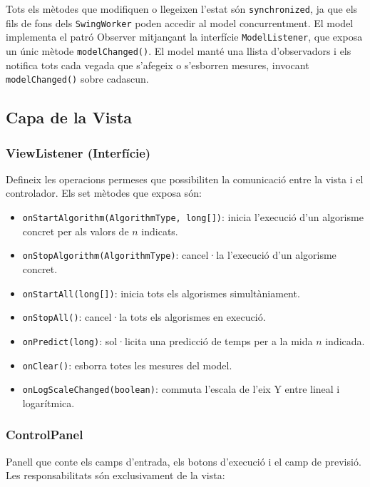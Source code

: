 \documentclass[conference,compsoc]{IEEEtran}
\begin{document}
Tots els mètodes que modifiquen o llegeixen l'estat són
\texttt{synchronized}, ja que els fils de fons dels \texttt{SwingWorker}
poden accedir al model concurrentment. El model implementa el patró
Observer mitjançant la interfície \texttt{ModelListener}, que exposa un
únic mètode \texttt{modelChanged()}. El model manté una llista
d'observadors i els notifica tots cada vegada que s'afegeix o s'esborren
mesures, invocant \texttt{modelChanged()} sobre cadascun.

\subsection{Capa de la Vista}

\subsubsection{ViewListener (Interfície)}

Defineix les operacions permeses que possibiliten la comunicació
entre la vista i el controlador. Els set mètodes que exposa són:

\begin{itemize}
    \item \texttt{onStartAlgorithm(AlgorithmType, long[])}: inicia l'execució d'un algorisme concret per als valors de $n$ indicats.
    \item \texttt{onStopAlgorithm(AlgorithmType)}: cancel·la l'execució d'un algorisme concret.
    \item \texttt{onStartAll(long[])}: inicia tots els algorismes simultàniament.
    \item \texttt{onStopAll()}: cancel·la tots els algorismes en execució.
    \item \texttt{onPredict(long)}: sol·licita una predicció de temps per a la mida $n$ indicada.
    \item \texttt{onClear()}: esborra totes les mesures del model.
    \item \texttt{onLogScaleChanged(boolean)}: commuta l'escala de l'eix Y entre lineal i logarítmica.
\end{itemize}

\subsubsection{ControlPanel}

Panell que conte els camps d'entrada, els botons d'execució i el camp de
previsió. Les responsabilitats són exclusivament de la vista:
\end{document}
